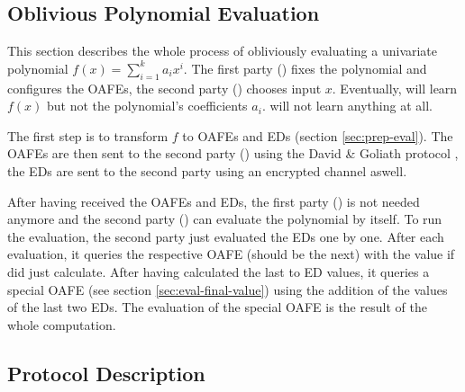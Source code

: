 \documentclass[12pt, a4paper]{article}
\begin{document}
%
%
\subsection{Oblivious Polynomial Evaluation}
\label{sec:ope}

This section describes the whole process of obliviously evaluating a univariate
polynomial $f(x) = \sum_{i=1}^k a_ix^i$. The first party (\JWpOne{}) fixes the
polynomial and configures the OAFEs, the second party (\JWpTwo{}) chooses input
$x$. Eventually, \JWpTwo{} will learn $f(x)$ but not the polynomial's
coefficients $a_i$. \JWpOne{} will not learn anything at all.

The first step is to transform $f$ to OAFEs and EDs (section
\ref{sec:prep-eval}). The OAFEs are then sent to the second party (\JWpTwo{})
using the David \& Goliath protocol \cite{davidgoliath}, the EDs are sent to the
second party using an encrypted channel aswell.

After having received the OAFEs and EDs, the first party (\JWpOne{}) is not
needed anymore and the second party (\JWpTwo{}) can evaluate the polynomial by
itself. To run the evaluation, the second party just evaluated the EDs one by
one. After each evaluation, it queries the respective OAFE (should be the next)
with the value if did just calculate. After having calculated the last to ED
values, it queries a special OAFE (see section \ref{sec:eval-final-value}) using
the addition of the values of the last two EDs. The evaluation of the special
OAFE is the result of the whole computation.
%
%
\subsection{Protocol Description} \label{sec:protocol-description}
\end{document}
